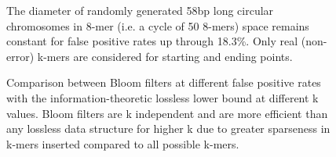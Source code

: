 \documentclass[draft]{pnastwo}
\begin{document}

\begin{figure}

\caption{The diameter of randomly generated 58bp long circular
  chromosomes in 8-mer (i.e. a cycle of 50 8-mers) space remains 
constant for false
  positive rates up through 18.3\%. Only real (non-error) k-mers are considered for
  starting and ending points.}
\label{fig:diam}
\end{figure}


\begin{figure}

\caption{Comparison between Bloom filters at different false positive 
rates with the information-theoretic lossless lower bound at different 
k values. Bloom filters are k independent and are more efficient than 
any lossless data structure for higher k due to greater sparseness in 
k-mers inserted compared to all possible k-mers.}

\label{fig:membound}
\end{figure}



\begin{table*}
\centering
\label{table:bitskmer}
\end{table*}

\end{document}

